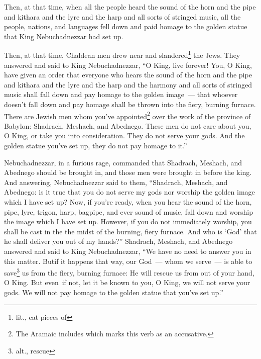 \begin{inparaenum}
     Then, at that time, when all the people heard the sound of the horn and the pipe and kithara and the lyre and the harp and all sorts of stringed music, all the people, nations, and languages fell down and paid homage to the golden statue that King Nebuchadnezzar had set up.%
    
     Then, at that time, Chaldean men drew near and slandered\footnote{lit., eat pieces of} the Jews.%
     They answered and said to King Nebuchadnezzar, ``O King, live forever!%
     You, O King, have given an order that everyone who hears the sound of the horn and the pipe and kithara and the lyre and the harp and the harmony and all sorts of stringed music shall fall down and pay homage to the golden image~---%
     that whoever doesn't fall down and pay homage shall be thrown into the fiery, burning furnace.%
     There are Jewish men whom you've appointed\footnote{The Aramaic includes  which marks this verb as an accusative.} over the work of the province of Babylon: Shadrach, Meshach, and Abednego. These men do not care about you, O King, or take you into consideration. They do not serve your gods. And the golden statue you've set up, they do not pay homage to it.''\understood%
    
     Nebuchadnezzar, in a furious rage, commanded that Shadrach, Meshach, and Abednego should be brought in, and those men were brought in before the king.%
     And answering, Nebuchadnezzar said to them, ``Shadrach, Meshach, and Abednego: is it true that you do not serve my gods nor worship the golden image which I have set up?%
     Now, if you're ready, when you hear the sound of the horn, pipe, lyre, trigon, harp, bagpipe, and ever sound of music, fall down and worship the image which I have set up. However, if you do not immediately worship, you shall be cast in the the midst of the burning, fiery furnace. And who is `God' that he shall deliver you out of my hands?''%
     Shadrach, Meshach, and Abednego answered and said to King Nebuchadnezzar, ``We have no need to answer you in this matter.%
     But\understood if it happens that way, our God~--- whom we serve~--- is able to save\footnote{alt., rescue} us from the fiery, burning furnace: He will rescue us from out of your hand, O King.%
     But even\understood\ if not, let it be known to you, O King, we will not serve your gods. We will not pay homage to the golden statue that you've set up.''%
    

\end{inparaenum}
